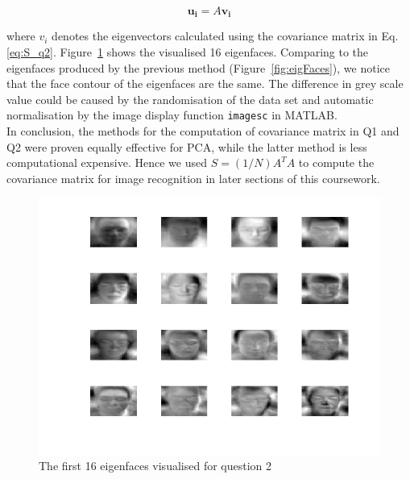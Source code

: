 \documentclass[10pt,twocolumn,letterpaper]{article}
\begin{document}
\begin{equation}
	\boldsymbol{u_i} = A \boldsymbol{v_i}
\end{equation}

where $v_i$ denotes the eigenvectors calculated using the covariance matrix in Eq.\ref{eq:S_q2}. Figure~\ref{fig:q2_eigFaces} shows the visualised 16 eigenfaces. Comparing to the eigenfaces produced by the previous method (Figure~\ref{fig:eigFaces}), we notice that the face contour of the eigenfaces are the same. The difference in grey scale value could be caused by the randomisation of the data set and automatic normalisation by the image display function \texttt{imagesc} in MATLAB.\\

In conclusion, the methods for the computation of covariance matrix in Q1 and Q2 were proven equally effective for PCA, while the latter method is less computational expensive. Hence we used $S = (1/N) A^T A$ to compute the covariance matrix for image recognition in later sections of this coursework.


\begin{figure}
	\begin{center}
		\includegraphics[width=0.8\linewidth]{q2_eigenfaces}
		\caption{The first 16 eigenfaces visualised for question 2}
		\label{fig:q2_eigFaces}
	\end{center}
\end{figure}

\end{document}
